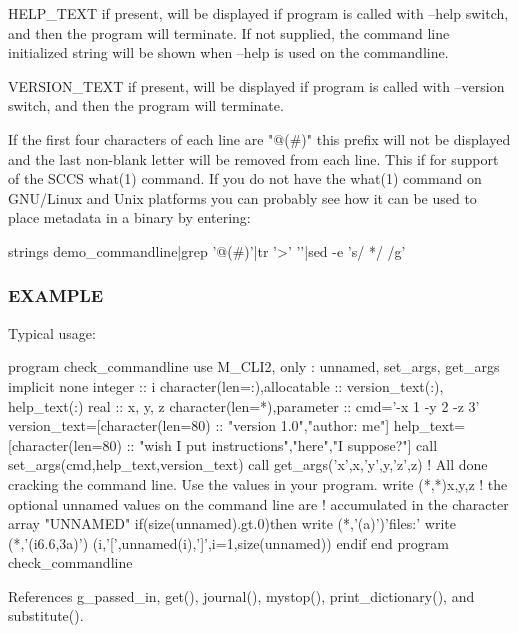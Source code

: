 \begin{DoxyVerb} HELP_TEXT     if present, will be displayed if program is called with
               --help switch, and then the program will terminate. If
               not supplied, the command line initialized string will be
               shown when --help is used on the commandline.

 VERSION_TEXT  if present, will be displayed if program is called with
               --version switch, and then the program will terminate.

    If the first four characters of each line are "@(#)" this prefix
    will not be displayed and the last non-blank letter will be
    removed from each line. This if for support of the SCCS what(1)
    command. If you do not have the what(1) command on GNU/Linux and
    Unix platforms you can probably see how it can be used to place
    metadata in a binary by entering:

        strings demo_commandline|grep '@(#)'|tr '>' '\n'|sed -e 's/  */ /g'
\end{DoxyVerb}


\subsubsection*{E\+X\+A\+M\+P\+LE}

Typical usage\+: \begin{DoxyVerb} program check_commandline
 use M_CLI2,  only : unnamed, set_args, get_args
 implicit none
 integer                      :: i
 character(len=:),allocatable :: version_text(:), help_text(:)
 real               :: x, y, z
 character(len=*),parameter :: cmd='-x 1 -y 2 -z 3'
    version_text=[character(len=80) :: "version 1.0","author: me"]
    help_text=[character(len=80) :: "wish I put instructions","here","I suppose?"]
    call set_args(cmd,help_text,version_text)
    call get_args('x',x,'y',y,'z',z)
    ! All done cracking the command line. Use the values in your program.
    write (*,*)x,y,z
    ! the optional unnamed values on the command line are
    ! accumulated in the character array "UNNAMED"
    if(size(unnamed).gt.0)then
       write (*,'(a)')'files:'
       write (*,'(i6.6,3a)') (i,'[',unnamed(i),']',i=1,size(unnamed))
    endif
 end program check_commandline \end{DoxyVerb}
 

References g\+\_\+passed\+\_\+in, get(), journal(), mystop(), print\+\_\+dictionary(), and substitute().

